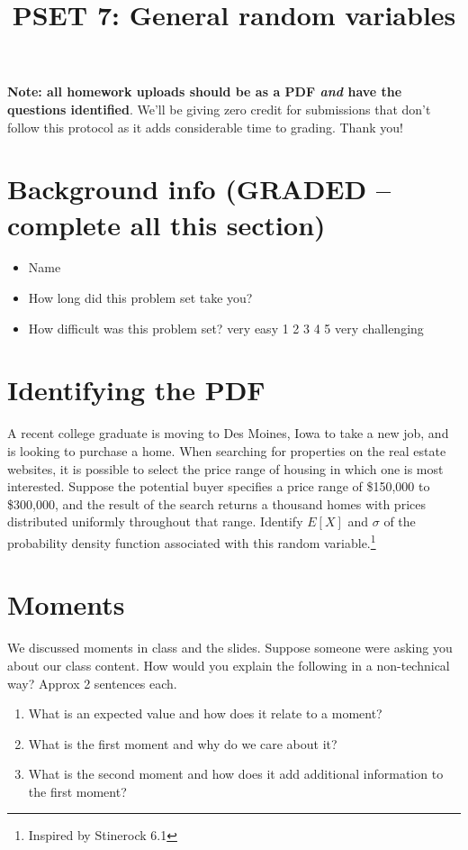\documentclass[
]{article}
\title{PSET 7: General random variables}
\author{}
\date{\vspace{-2.5em}}
\providecommand{\tightlist}{%
  \setlength{\itemsep}{0pt}\setlength{\parskip}{0pt}}
\begin{document}
\maketitle

\textbf{Note: all homework uploads should be as a PDF \emph{and} have
the questions identified}. We'll be giving zero credit for submissions
that don't follow this protocol as it adds considerable time to grading.
Thank you!

\section{Background info (GRADED -- complete all this
section)}\label{background-info-graded-complete-all-this-section}

\begin{itemize}
\item
  Name
\item
  How long did this problem set take you?
\item
  How difficult was this problem set? very easy 1 2 3 4 5 very
  challenging
\end{itemize}

\section{Identifying the PDF}\label{identifying-the-pdf}

A recent college graduate is moving to Des Moines, Iowa to take a new
job, and is looking to purchase a home. When searching for properties on
the real estate websites, it is possible to select the price range of
housing in which one is most interested. Suppose the potential buyer
specifies a price range of \$150,000 to \$300,000, and the result of the
search returns a thousand homes with prices distributed uniformly
throughout that range. Identify \(E[X]\) and \(\sigma\) of the
probability density function associated with this random
variable.\footnote{Inspired by Stinerock 6.1}

\section{Moments}\label{moments}

We discussed moments in class and the slides. Suppose someone were
asking you about our class content. How would you explain the following
in a non-technical way? Approx 2 sentences each.

\begin{enumerate}
\def\labelenumi{\alph{enumi}.}
\tightlist
\item
  What is an expected value and how does it relate to a moment?
\item
  What is the first moment and why do we care about it?
\item
  What is the second moment and how does it add additional information
  to the first moment?
\end{enumerate}
\end{document}
